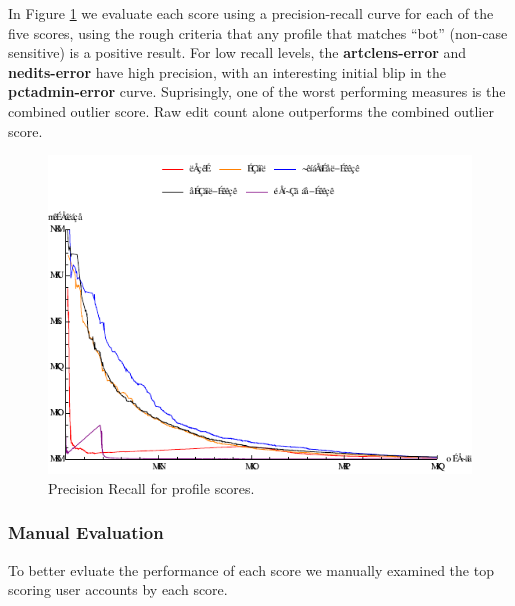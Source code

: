\documentclass{article}
\begin{document}
In Figure \ref{prec} we evaluate each score using a precision-recall curve for each of the five scores, using the rough criteria that any profile that matches ``bot'' (non-case sensitive) is a positive result. For low recall levels, the \textbf{artclens-error} and \textbf{nedits-error} have high precision, with an interesting initial blip in the \textbf{pctadmin-error} curve. Suprisingly, one of the worst performing measures is the combined outlier score. Raw edit count alone outperforms the combined outlier score.

\begin{figure}
\centering
\includegraphics[width=4.5in, keepaspectratio = true]{precisionrecall.pdf}
\caption{Precision Recall for profile scores.}
\label{prec}
\end{figure}

\subsubsection{Manual Evaluation}

To better evluate the performance of each score we manually examined the top scoring user accounts by each score.
\end{document}
